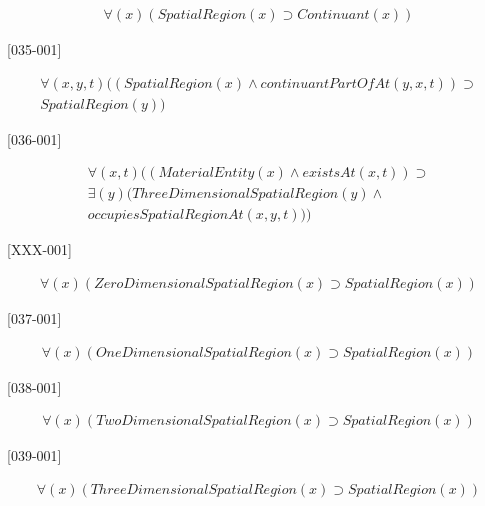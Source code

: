\documentclass{article}
\begin{document}
\begin{flushright}
[153-001] 

\begin{equation}
\begin{split}
{\forall}(x)(SpatialRegion(x) \supset Continuant(x))
\end{split}
\end{equation}

[035-001] 

\begin{equation}
\begin{split}
{\forall}(x, y, t)((SpatialRegion(x) \wedge continuantPartOfAt(y, x, t)) \supset \\
SpatialRegion(y))
\end{split}
\end{equation}

[036-001] 

\begin{equation}
\begin{split}
{\forall}(x, t)((MaterialEntity(x) \wedge existsAt(x, t)) \supset \\
{\exists}(y)(ThreeDimensionalSpatialRegion(y) \wedge \\
occupiesSpatialRegionAt(x, y, t)))
\end{split}
\end{equation}

[XXX-001] 

\begin{equation}
\begin{split}
{\forall}(x)(ZeroDimensionalSpatialRegion(x) \supset SpatialRegion(x))
\end{split}
\end{equation}

[037-001] 

\begin{equation}
\begin{split}
{\forall}(x)(OneDimensionalSpatialRegion(x) \supset SpatialRegion(x))
\end{split}
\end{equation}

[038-001] 

\begin{equation}
\begin{split}
{\forall}(x)(TwoDimensionalSpatialRegion(x) \supset SpatialRegion(x))
\end{split}
\end{equation}

[039-001] 

\begin{equation}
\begin{split}
{\forall}(x)(ThreeDimensionalSpatialRegion(x) \supset SpatialRegion(x))
\end{split}
\end{equation}


\end{flushright}
\end{document}
